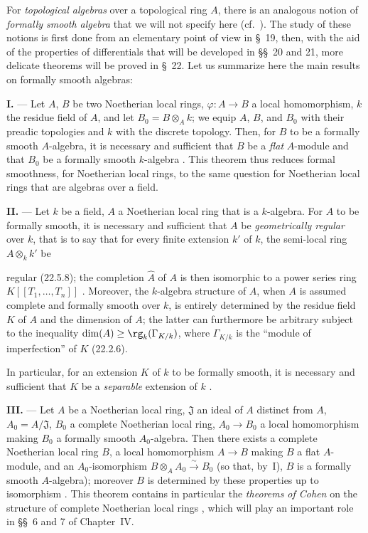 \begin{env}[19.0.2]
\label{0.19.0.2}
For \emph{topological algebras} over a topological ring $A$, there is an analogous notion of \emph{formally smooth algebra} that we will not specify here (cf.~).
The study of these notions is first done from an elementary point of view in \S~19, then, with the aid of the properties of differentials that will be developed in \S\S~20 and 21, more delicate theorems will be proved in \S~22.
Let us summarize here the main results on formally smooth algebras:

\medskip\noindent\textbf{I.} ---
Let $A$, $B$ be two Noetherian local rings, $\varphi:A\to B$ a local homomorphism, $k$ the residue field of $A$, and let $B_0=B\otimes_A k$;
we equip $A$, $B$, and $B_0$ with their preadic topologies and $k$ with the discrete topology.
Then, for $B$ to be a formally smooth $A$-algebra, it is necessary and sufficient that $B$ be a \emph{flat} $A$-module and that $B_0$ be a formally smooth $k$-algebra .
This theorem thus reduces formal smoothness, for Noetherian local rings, to the same question for Noetherian local rings that are algebras over a field.

\medskip\noindent\textbf{II.} ---
Let $k$ be a field, $A$ a Noetherian local ring that is a $k$-algebra.
For $A$ to be formally smooth, it is necessary and sufficient that $A$ be \emph{geometrically regular} over $k$, that is to say that for every finite extension $k'$ of $k$, the semi-local ring $A\otimes_k k'$ be


regular (22.5.8); the completion $\widehat{A}$ of $A$ is then isomorphic to a power series ring $K[[T_1,\ldots,T_n]]$ .
Moreover, the $k$-algebra structure of $A$, when $A$ is assumed complete and formally smooth over $k$, is entirely determined by the residue field $K$ of $A$ and the dimension of $A$;
the latter can furthermore be arbitrary subject to the inequality $\dim(A)\geq\rg_k(\Gamma_{K/k})$, where $\Gamma_{K/k}$ is the ``module of imperfection'' of $K$ (22.2.6).

In particular, for an extension $K$ of $k$ to be formally smooth, it is necessary and sufficient that $K$ be a \emph{separable} extension of $k$ .

\medskip\noindent\textbf{III.} ---
Let $A$ be a Noetherian local ring, $\mathfrak{J}$ an ideal of $A$ distinct from $A$, $A_0=A/\mathfrak{J}$, $B_0$ a complete Noetherian local ring, $A_0\to B_0$ a local homomorphism making $B_0$ a formally smooth $A_0$-algebra.
Then there exists a complete Noetherian local ring $B$, a local homomorphism $A\to B$ making $B$ a flat $A$-module, and an $A_0$-isomorphism $B\otimes_A A_0\xrightarrow{\sim}B_0$ (so that, by~I), $B$ is a formally smooth $A$-algebra);
moreover $B$ is determined by these properties up to isomorphism .
This theorem contains in particular the \emph{theorems of Cohen} on the structure of complete Noetherian local rings , which will play an important role in \S\S~6 and 7 of Chapter~IV.


\end{env}
